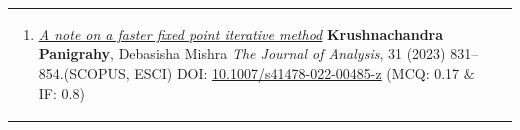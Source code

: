 \documentclass[a4paper,12pt]{article}
\begin{document}
\begin{longtable}{lp{15cm}}
\begin{enumerate}[resume]
\item \href{https://doi.org/10.1007/s41478-022-00485-z}{\it A note on a faster fixed point iterative method}\newline
{\footnotesize
{\bf Krushnachandra Panigrahy}, Debasisha Mishra \newline
{\it The Journal of Analysis}, 31 (2023) 831–854.\hfill{(SCOPUS, ESCI)}\newline
DOI: \href{https://doi.org/10.1007/s41478-022-00485-z}{10.1007/s41478-022-00485-z} \hfill(MCQ: 0.17 $\&$ IF: 0.8)
}
\end{enumerate}\\
\end{longtable}
\end{document}
